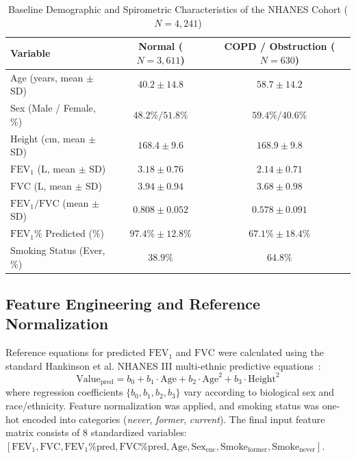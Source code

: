 \documentclass[conference]{IEEEtran}
\begin{document}
\begin{table}[h]
\caption{Baseline Demographic and Spirometric Characteristics of the NHANES Cohort ($N=4,241$)}
\label{tab:demographics}
\centering
\begin{tabular}{lcc}
\toprule
\textbf{Variable} & \textbf{Normal ($N=3,611$)} & \textbf{COPD / Obstruction ($N=630$)} \\
\midrule
Age (years, mean $\pm$ SD) & $40.2 \pm 14.8$ & $58.7 \pm 14.2$ \\
Sex (Male / Female, \%) & $48.2\% / 51.8\%$ & $59.4\% / 40.6\%$ \\
Height (cm, mean $\pm$ SD) & $168.4 \pm 9.6$ & $168.9 \pm 9.8$ \\
$\text{FEV}_1$ (L, mean $\pm$ SD) & $3.18 \pm 0.76$ & $2.14 \pm 0.71$ \\
$\text{FVC}$ (L, mean $\pm$ SD) & $3.94 \pm 0.94$ & $3.68 \pm 0.98$ \\
$\text{FEV}_1/\text{FVC}$ (mean $\pm$ SD) & $0.808 \pm 0.052$ & $0.578 \pm 0.091$ \\
$\text{FEV}_1\%$ Predicted (\%) & $97.4\% \pm 12.8\%$ & $67.1\% \pm 18.4\%$ \\
Smoking Status (Ever, \%) & $38.9\%$ & $64.8\%$ \\
\bottomrule
\end{tabular}
\end{table}

\subsection{Feature Engineering and Reference Normalization}
Reference equations for predicted $\text{FEV}_1$ and $\text{FVC}$ were calculated using the standard Hankinson et al. NHANES III multi-ethnic predictive equations~\cite{hankinson1999spirometric}:
\begin{equation}
\text{Value}_{\text{pred}} = b_0 + b_1 \cdot \text{Age} + b_2 \cdot \text{Age}^2 + b_3 \cdot \text{Height}^2
\end{equation}
where regression coefficients $\{b_0, b_1, b_2, b_3\}$ vary according to biological sex and race/ethnicity. Feature normalization was applied, and smoking status was one-hot encoded into categories (\textit{never}, \textit{former}, \textit{current}). The final input feature matrix consists of 8 standardized variables: $[\text{FEV}_1, \text{FVC}, \text{FEV}_1\% \text{pred}, \text{FVC}\% \text{pred}, \text{Age}, \text{Sex}_{\text{enc}}, \text{Smoke}_{\text{former}}, \text{Smoke}_{\text{never}}]$.
\end{document}

